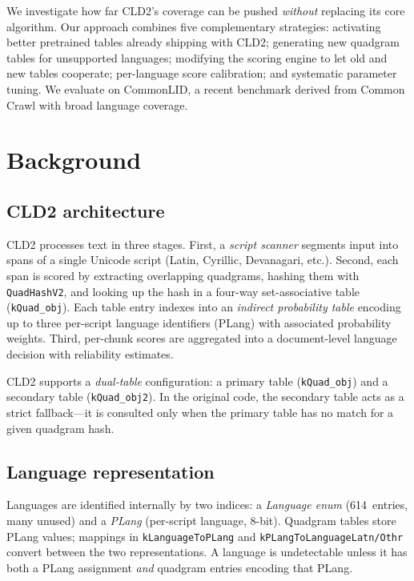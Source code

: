 \documentclass{article}
\begin{document}
We investigate how far CLD2's coverage can be pushed \emph{without} replacing its core algorithm.
Our approach combines five complementary strategies: activating better pretrained tables already shipping with CLD2; generating new quadgram tables for unsupported languages; modifying the scoring engine to let old and new tables cooperate; per-language score calibration; and systematic parameter tuning.
We evaluate on CommonLID, a recent benchmark derived from Common Crawl with broad language coverage.

\section{Background}
\label{sec:background}

\subsection{CLD2 architecture}

CLD2 processes text in three stages.
First, a \emph{script scanner} segments input into spans of a single Unicode script (Latin, Cyrillic, Devanagari, etc.).
Second, each span is scored by extracting overlapping quadgrams, hashing them with \texttt{QuadHashV2}, and looking up the hash in a four-way set-associative table (\texttt{kQuad\_obj}).
Each table entry indexes into an \emph{indirect probability table} encoding up to three per-script language identifiers (PLang) with associated probability weights.
Third, per-chunk scores are aggregated into a document-level language decision with reliability estimates.

CLD2 supports a \emph{dual-table} configuration: a primary table (\texttt{kQuad\_obj}) and a secondary table (\texttt{kQuad\_obj2}).
In the original code, the secondary table acts as a strict fallback---it is consulted only when the primary table has no match for a given quadgram hash.

\subsection{Language representation}

Languages are identified internally by two indices: a \emph{Language enum} (614~entries, many unused) and a \emph{PLang} (per-script language, 8-bit).
Quadgram tables store PLang values; mappings in \texttt{kLanguageToPLang} and \texttt{kPLangToLanguageLatn/Othr} convert between the two representations.
A language is undetectable unless it has both a PLang assignment \emph{and} quadgram entries encoding that PLang.
\end{document}
